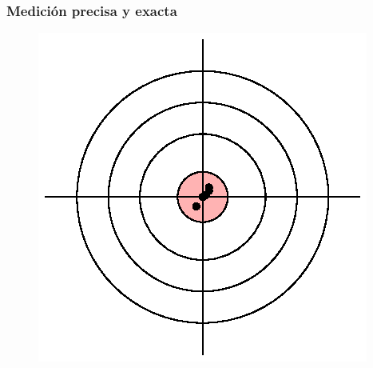 \documentclass[12pt]{beamer}
\begin{document}
\begin{frame}
\frametitle{Medición precisa y exacta}
\begin{figure}
    \centering  
    \includegraphics[scale=1]{Imagenes/exactitud_precision_01.eps}
\end{figure}
\end{frame}
\end{document}
